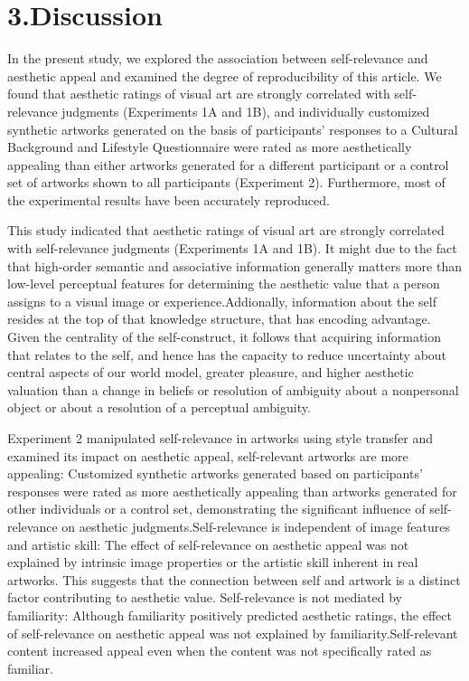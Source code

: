 \documentclass[
  man]{apa6}
\begin{document}
\hypertarget{discussion}{%
\section{3.Discussion}\label{discussion}}

In the present study, we explored the association between self-relevance and aesthetic appeal and examined the degree of reproducibility of this article. We found that aesthetic ratings of visual art are strongly correlated with self-relevance judgments (Experiments 1A and 1B), and individually customized synthetic artworks generated on the basis of participants' responses to a Cultural Background and Lifestyle Questionnaire were rated as more aesthetically appealing than either artworks generated for a different participant or a control set of artworks shown to all participants (Experiment 2). Furthermore, most of the experimental results have been accurately reproduced.

This study indicated that aesthetic ratings of visual art are strongly correlated with self-relevance judgments (Experiments 1A and 1B). It might due to the fact that high-order semantic and associative information generally matters more than low-level perceptual features for determining the aesthetic value that a person assigns to a visual image or experience.Addionally, information about the self resides at the top of that knowledge structure, that has encoding advantage. Given the centrality of the self-construct, it follows that acquiring information that relates to the self, and hence has the capacity to reduce uncertainty about central aspects of our world model, greater pleasure, and higher aesthetic valuation than a change in beliefs or resolution of ambiguity about a nonpersonal object or about a resolution of a perceptual ambiguity.

Experiment 2 manipulated self-relevance in artworks using style transfer and examined its impact on aesthetic appeal, self-relevant artworks are more appealing: Customized synthetic artworks generated based on participants' responses were rated as more aesthetically appealing than artworks generated for other individuals or a control set, demonstrating the significant influence of self-relevance on aesthetic judgments.Self-relevance is independent of image features and artistic skill: The effect of self-relevance on aesthetic appeal was not explained by intrinsic image properties or the artistic skill inherent in real artworks. This suggests that the connection between self and artwork is a distinct factor contributing to aesthetic value. Self-relevance is not mediated by familiarity: Although familiarity positively predicted aesthetic ratings, the effect of self-relevance on aesthetic appeal was not explained by familiarity.Self-relevant content increased appeal even when the content was not specifically rated as familiar.
\end{document}
